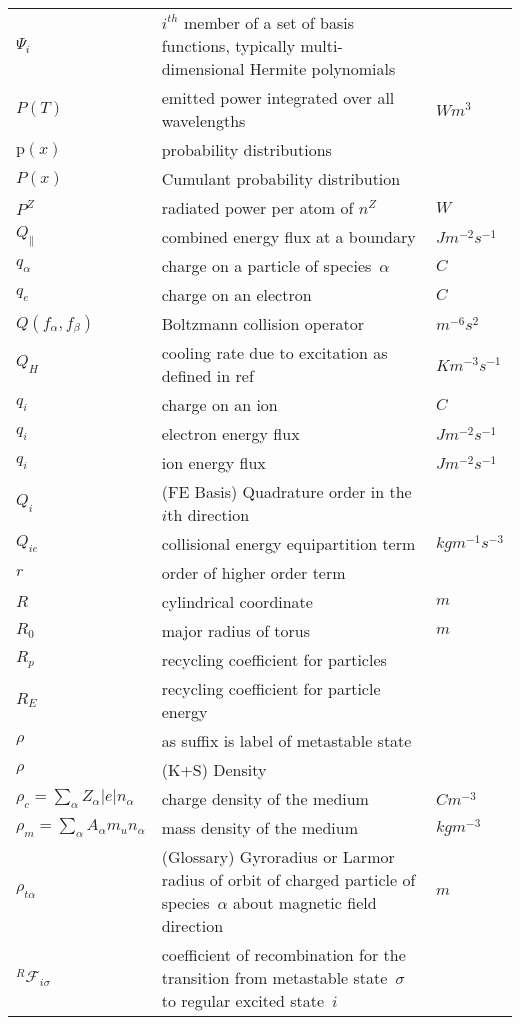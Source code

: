 \begin{longtable}{|p{3.0cm}|p{10.0cm}|p{3.0cm}|}
$\Psi_i$ & $i^{th}$ member of a set of basis functions, typically multi-dimensional Hermite polynomials & \\
$P(T)$ & emitted power integrated over all wavelengths  & $W m^3$ \\
$\mathrm{p}(x)$ & probability distributions    & \\
$P(x)$ & Cumulant probability distribution  & \\
$P^Z$ & radiated power per atom of $n^Z$  & $W$ \\
$Q_\|$ & combined energy flux at a boundary  & $J m^{-2} s^{-1}$ \\
$q_\alpha$ & charge on a particle of species~$\alpha$ & $C$ \\
$q_e$ & charge on an electron & $C$ \\
$Q(f_\alpha, f_\beta)$ & Boltzmann collision operator  & $m^{-6} s^2$ \\
$Q_H$ & cooling rate due to excitation as defined in ref~\cite{Ha13Benc}  & $K m^{-3} s^{-1}$ \\
$q_i$ & charge on an ion  & $C$ \\
$q_i$ & electron energy flux  & $J m^{-2} s^{-1}$ \\
$q_i$ & ion energy flux  & $J m^{-2} s^{-1}$ \\
$Q_i$ &  (FE Basis) Quadrature order in the $i$th direction & \\
$Q_{ie}$ & collisional energy equipartition term  & $kg m^{-1} s^{-3}$ \\
$r$ & order of higher order term  & \\
$R$ & cylindrical coordinate  & $m$ \\
$R_0$ & major radius of torus & $m$ \\
$R_p$ & recycling coefficient for particles & \\
$R_E$ & recycling coefficient for particle energy & \\
$\rho$ & as suffix is label of metastable state & \\
$\rho$ &  (K+S) Density & \\
$\rho_c=\sum_\alpha Z_\alpha |e| n_\alpha$ & charge density of the medium  & $C m^{-3}$ \\
$\rho_m=\sum_\alpha A_\alpha m_u n_\alpha$ & mass density of the medium  & $kg m^{-3}$ \\
$\rho_{t\alpha}$  & (Glossary) Gyroradius or Larmor radius of orbit of charged particle of species~$\alpha$ about magnetic field direction  & $m$ \\
$^R\mathcal{F}_{i\sigma}$ & coefficient of recombination for the transition from metastable state~$\sigma$ to regular excited state~$i$  & \\

\end{longtable}
